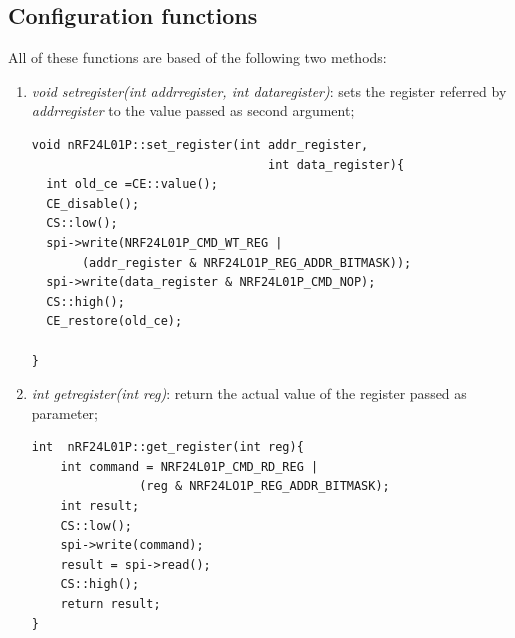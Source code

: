 \documentclass[11pt,a4paper,oneside]{article}
\begin{document}
\subsection{Configuration functions}
All of these functions are based of the following two methods:
\begin{enumerate}
\item {\itshape void set\textunderscore register(int addr\textunderscore register, int data\textunderscore register)}:
sets the register referred by {\itshape addr\textunderscore register} to the value passed as second argument;
\lstset{numbers=left,numberstyle=\tiny}
\begin{lstlisting}[frame=single]
void nRF24L01P::set_register(int addr_register,
                                 int data_register){
  int old_ce =CE::value();    
  CE_disable(); 
  CS::low();
  spi->write(NRF24L01P_CMD_WT_REG |
       (addr_register & NRF24LO1P_REG_ADDR_BITMASK));
  spi->write(data_register & NRF24L01P_CMD_NOP);   
  CS::high();
  CE_restore(old_ce);

}
\end{lstlisting}
\item {\itshape int get\textunderscore register(int reg)}: return the actual value of the register passed as parameter;
\lstset{numbers=left,numberstyle=\tiny}
\begin{lstlisting}[frame=single]
int  nRF24L01P::get_register(int reg){
    int command = NRF24L01P_CMD_RD_REG | 
    	       (reg & NRF24LO1P_REG_ADDR_BITMASK);
    int result;
    CS::low();
    spi->write(command);   
    result = spi->read();
    CS::high();
    return result;   
}
\end{lstlisting}
\end{enumerate}
\end{document}
